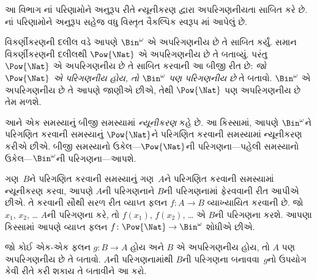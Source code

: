 \begingroup
\makeatletter{}\makeatother


\label{guunit:OLP-0040}


\begin{editorial}
  આ વિભાગ નાં પરિણામોને અનુરૂપ રીતે
  ન્યૂનીકરણ દ્વારા અપરિગણનીયતા સાબિત કરે છે. નાં
  પરિણામોને અનુરૂપ
  સહેજ વધુ વિસ્તૃત વૈકલ્પિક સ્વરૂપ માં આપેલું છે.
\end{editorial}

વિકર્ણીકરણની દલીલ વડે આપણે $\Bin^\omega$ એ અપરિગણનીય
છે તે સાબિત કર્યું. સમાન વિકર્ણીકરણની દલીલથી $\Pow{\Nat}$ એ
અપરિગણનીય છે તે બતાવ્યું. પરંતુ $\Pow{\Nat}$ એ
અપરિગણનીય છે તે સાબિત કરવાની
આ બીજી રીત છે:
\emph{જો $\Pow{\Nat}$ એ પરિગણનીય હોય, તો $\Bin^\omega$ પણ
પરિગણનીય છે} તે બતાવો. $\Bin^\omega$ એ અપરિગણનીય
છે તે આપણે જાણીએ છીએ, તેથી $\Pow{\Nat}$ પણ અપરિગણનીય છે તેમ મળશે.

આને એક સમસ્યાનું બીજી સમસ્યામાં \emph{ન્યૂનીકરણ} કહે છે. આ કિસ્સામાં,
આપણે $\Bin^\omega$ને પરિગણિત કરવાની સમસ્યાનું $\Pow{\Nat}$ને
પરિગણિત કરવાની સમસ્યામાં ન્યૂનીકરણ કરીએ છીએ. બીજી સમસ્યાનો
ઉકેલ---$\Pow{\Nat}$ની પરિગણના---પહેલી સમસ્યાનો
ઉકેલ---$\Bin^\omega$ની પરિગણના---આપશે.

ગણ~$B$ને પરિગણિત કરવાની સમસ્યાનું ગણ~$A$ને પરિગણિત કરવાની
સમસ્યામાં ન્યૂનીકરણ કરવા, આપણે $A$ની પરિગણનાને $B$ની પરિગણનામાં
ફેરવવાની રીત આપીએ છીએ. તે કરવાની સૌથી સરળ રીત વ્યાપ્ત ફલન
$f\colon A \to B$ વ્યાખ્યાયિત કરવાની છે. જો $x_1$, $x_2$, \dots{}
$A$ની પરિગણના કરે, તો $f(x_1)$, $f(x_2)$, \dots{} એ $B$ની
પરિગણના કરશે. આપણા કિસ્સામાં આપણે વ્યાપ્ત ફલન
$f\colon \Pow{\Nat} \to \Bin^\omega$ શોધીએ છીએ.

\begin{prob}
જો કોઈ એક-એક ફલન $g\colon B \to A$ હોય અને $B$ એ
અપરિગણનીય હોય, તો $A$ પણ અપરિગણનીય છે તે બતાવો. $A$ની
પરિગણનામાંથી $B$ની પરિગણના બનાવવા~$g$નો ઉપયોગ કેવી રીતે કરી
શકાય તે બતાવીને આ કરો.
\end{prob}

